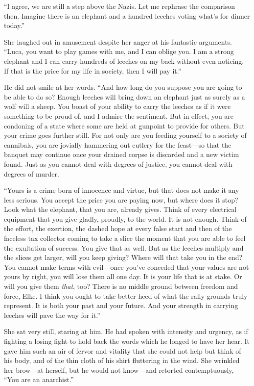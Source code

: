``I agree, we are still a step above the Nazis. Let me rephrase the comparison then. Imagine there is an elephant and a hundred leeches voting what's for dinner today.''

She laughed out in amusement despite her anger at his fantastic arguments. ``Luca, you want to play games with me, and I can oblige you. I am a strong elephant and I can carry hundreds of leeches on my back without even noticing. If that is the price for my life in society, then I will pay it.''

He did not smile at her words. ``And how long do you suppose you are going to be able to do so? Enough leeches will bring down an elephant just as surely as a wolf will a sheep. You boast of your ability to carry the leeches as if it were something to be proud of, and I admire the sentiment. But in effect, you are condoning of a state where some are held at gunpoint to provide for others. But your crime goes further still. For not only are you feeding yourself to a society of cannibals, you are jovially hammering out cutlery for the feast---so that the banquet may continue once your drained corpse is discarded and a new victim found. Just as you cannot deal with degrees of justice, you cannot deal with degrees of murder.

``Yours is a crime born of innocence and virtue, but that does not make it any less serious. You accept the price you are paying now, but where does it stop? Look what the elephant, that you are, already gives. Think of every electrical equipment that you give gladly, proudly, to the world. It is not enough. Think of the effort, the exertion, the dashed hope at every false start and then of the faceless tax collector coming to take a slice the moment that you are able to feel the exultation of success. You give that as well. But as the leeches multiply and the slices get larger, will you keep giving? Where will that take you in the end? You cannot make terms with evil---once you've conceded that your values are not yours by right, you will lose them all one day. It is your life that is at stake. Or will you give them \emph{that}, too? There is no middle ground between freedom and force, Elke. I think you ought to take better heed of what the rally grounds truly represent. It is both your past and your future. And your strength in carrying leeches will pave the way for it.''

She sat very still, staring at him. He had spoken with intensity and urgency, as if fighting a losing fight to hold back the words which he longed to have her hear. It gave him such an air of fervor and vitality that she could not help but think of his body, and of the thin cloth of his shirt fluttering in the wind. She wrinkled her brow---at herself, but he would not know---and retorted contemptuously, ``You are an anarchist.''

